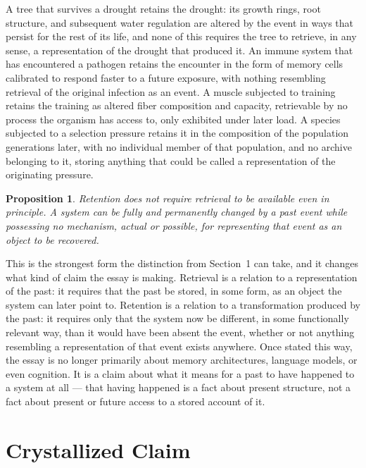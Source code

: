 \documentclass[11pt]{amsart}
\theoremstyle{plain}
\newtheorem{proposition}[theorem]{Proposition}
\theoremstyle{definition}
\theoremstyle{remark}
\begin{document}
A tree that survives a drought retains the drought: its growth rings,
root structure, and subsequent water regulation are altered by the
event in ways that persist for the rest of its life, and none of this
requires the tree to retrieve, in any sense, a representation of the
drought that produced it. An immune system that has encountered a
pathogen retains the encounter in the form of memory cells calibrated
to respond faster to a future exposure, with nothing resembling
retrieval of the original infection as an event. A muscle subjected to
training retains the training as altered fiber composition and
capacity, retrievable by no process the organism has access to, only
exhibited under later load. A species subjected to a selection pressure
retains it in the composition of the population generations later, with
no individual member of that population, and no archive belonging to
it, storing anything that could be called a representation of the
originating pressure.

\begin{proposition}
\label{prop:retention-without-retrieval}
Retention does not require retrieval to be available even in
principle. A system can be fully and permanently changed by a past
event while possessing no mechanism, actual or possible, for
representing that event as an object to be recovered.
\end{proposition}

This is the strongest form the distinction from Section~1 can take, and
it changes what kind of claim the essay is making. Retrieval is a
relation to a representation of the past: it requires that the past be
stored, in some form, as an object the system can later point to.
Retention is a relation to a transformation produced by the past: it
requires only that the system now be different, in some functionally
relevant way, than it would have been absent the event, whether or not
anything resembling a representation of that event exists anywhere. Once
stated this way, the essay is no longer primarily about memory
architectures, language models, or even cognition. It is a claim about
what it means for a past to have happened to a system at all --- that
having happened is a fact about present structure, not a fact about
present or future access to a stored account of it.

\section{Crystallized Claim}
\end{document}
